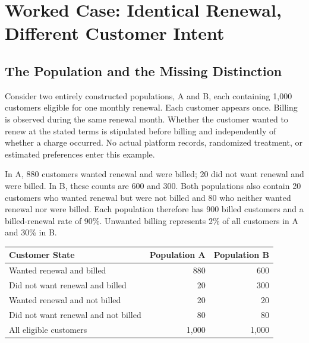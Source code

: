 
\hypertarget{M09-worked-case-identical-renewal-different-customer-intent}{%
\section{Worked Case: Identical Renewal, Different Customer
Intent}\label{M09-worked-case-identical-renewal-different-customer-intent}}

\noindent \hypertarget{M09-the-population-and-the-missing-distinction}{%
\subsection{The Population and the Missing
Distinction}\label{M09-the-population-and-the-missing-distinction}}

\noindent \noindent Consider two entirely constructed populations, A and B, each
containing 1,000 customers eligible for one monthly renewal. Each
customer appears once. Billing is observed during the same renewal
month. Whether the customer wanted to renew at the stated terms is
stipulated before billing and independently of whether a charge
occurred. No actual platform records, randomized treatment, or estimated
preferences enter this example.

In A, 880 customers wanted renewal and were billed; 20 did not want
renewal and were billed. In B, these counts are 600 and 300. Both
populations also contain 20 customers who wanted renewal but were not
billed and 80 who neither wanted renewal nor were billed. Each
population therefore has 900 billed customers and a billed-renewal rate
of 90\%. Unwanted billing represents 2\% of all customers in A and 30\%
in B.

\begin{table}[H]
\centering\small
\begin{tabular}{@{}lrr@{}}
\toprule
Customer State & Population A & Population B \\
\midrule

Wanted renewal and billed & 880 & 600 \\
Did not want renewal and billed & 20 & 300 \\
Wanted renewal and not billed & 20 & 20 \\
Did not want renewal and not billed & 80 & 80 \\
All eligible customers & 1,000 & 1,000 \\
\bottomrule
\end{tabular}
\end{table}

